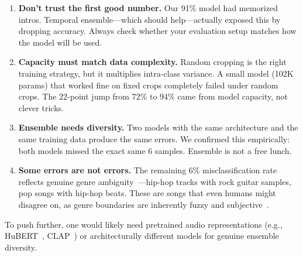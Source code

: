 \begin{enumerate}
  \item \textbf{Don't trust the first good number.} Our 91\% model had memorized intros. Temporal ensemble---which should help---actually exposed this by dropping accuracy. Always check whether your evaluation setup matches how the model will be used.

  \item \textbf{Capacity must match data complexity.} Random cropping is the right training strategy, but it multiplies intra-class variance. A small model (102K params) that worked fine on fixed crops completely failed under random crops. The 22-point jump from 72\% to 94\% came from model capacity, not clever tricks.

  \item \textbf{Ensemble needs diversity.} Two models with the same architecture and the same training data produce the same errors. We confirmed this empirically: both models missed the exact same 6 samples. Ensemble is not a free lunch.

  \item \textbf{Some errors are not errors.} The remaining 6\% misclassification rate reflects genuine genre ambiguity~\cite{sturm2013gtzan}---hip-hop tracks with rock guitar samples, pop songs with hip-hop beats. These are songs that even humans might disagree on, as genre boundaries are inherently fuzzy and subjective~\cite{aucouturier2003representing}.
\end{enumerate}

To push further, one would likely need pretrained audio representations (e.g., HuBERT~\cite{hsu2021hubert}, CLAP~\cite{wu2023clap}) or architecturally different models for genuine ensemble diversity.



